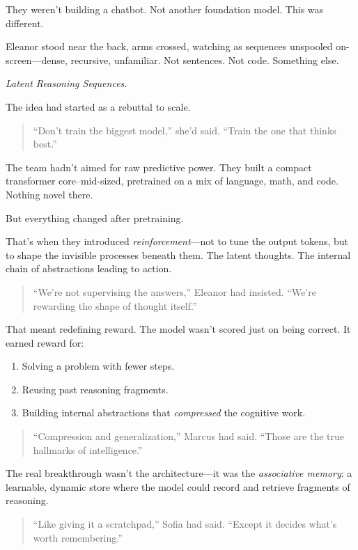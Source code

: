 \documentclass[12pt,oneside]{book}
\begin{document}
They weren’t building a chatbot. Not another foundation model. This was different.

Eleanor stood near the back, arms crossed, watching as sequences unspooled on-screen—dense, recursive, unfamiliar. Not sentences. Not code. Something else.

\emph{Latent Reasoning Sequences.}

The idea had started as a rebuttal to scale.

\begin{quote}
``Don't train the biggest model,'' she’d said. ``Train the one that thinks best.''
\end{quote}

The team hadn’t aimed for raw predictive power. They built a compact transformer core--mid-sized, pretrained on a mix of language, math, and code. Nothing novel there.

But everything changed after pretraining.

That’s when they introduced \emph{reinforcement}—not to tune the output tokens, but to shape the invisible processes beneath them. The latent thoughts. The internal chain of abstractions leading to action.

\begin{quote}
``We’re not supervising the answers,'' Eleanor had insisted.  
``We’re rewarding the shape of thought itself.''
\end{quote}
That meant redefining reward. The model wasn’t scored just on being correct. It earned reward for:

\begin{enumerate}
\item Solving a problem with fewer steps.  
\item Reusing past reasoning fragments.  
\item Building internal abstractions that \emph{compressed} the cognitive work.
\end{enumerate}

\begin{quote}
``Compression and generalization,'' Marcus had said.  
``Those are the true hallmarks of intelligence.''
\end{quote}

The real breakthrough wasn’t the architecture—it was the \emph{associative memory}: a learnable, dynamic store where the model could record and retrieve fragments of reasoning.

\begin{quote}
``Like giving it a scratchpad,'' Sofia had said. ``Except it decides what’s worth remembering.''
\end{quote}
\end{document}
